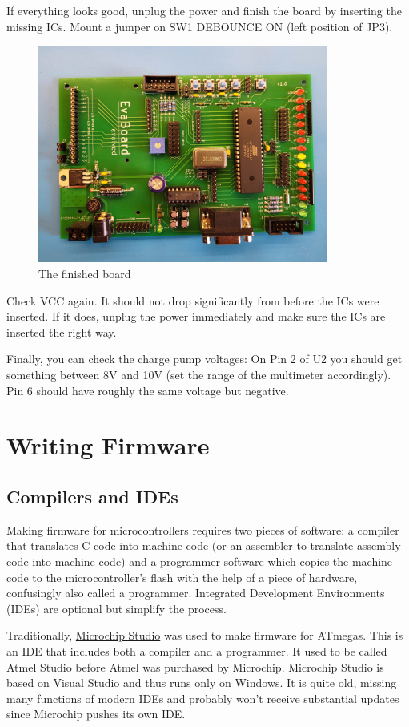 \documentclass{article}
\begin{document}
If everything looks good, unplug the power and finish the board by inserting the missing ICs. Mount a jumper on SW1 DEBOUNCE ON (left position of JP3). 
\begin{figure}[htb]
\centering
\includegraphics[width=0.85\textwidth]{Pictures/Finished.jpg}
\caption{The finished board}
\label{fig:finished}
\end{figure}

Check VCC again. It should not drop significantly from before the ICs were inserted. If it does, unplug the power immediately and make sure the ICs are inserted the right way. 

Finally, you can check the charge pump voltages: On Pin 2 of U2 you should get something between 8V and 10V (set the range of the multimeter accordingly). Pin 6 should have roughly the same voltage but negative. 

\section{Writing Firmware}
\subsection{Compilers and IDEs}\label{sec:compilersIDEs}
Making firmware for microcontrollers requires two pieces of software: a compiler that translates C code into machine code (or an assembler to translate assembly code into machine code) and a programmer software which copies the machine code to the microcontroller's flash with the help of a piece of hardware, confusingly also called a programmer. Integrated Development Environments (IDEs) are optional but simplify the process. 

Traditionally, \href{https://www.microchip.com/en-us/tools-resources/develop/microchip-studio}{Microchip Studio} was used to make firmware for ATmegas. This is an IDE that includes both a compiler and a programmer. It used to be called Atmel Studio before Atmel was purchased by Microchip. Microchip Studio is based on Visual Studio and thus runs only on Windows. It is quite old, missing many functions of modern IDEs and probably won't receive substantial updates since Microchip pushes its own IDE. 
\end{document}
